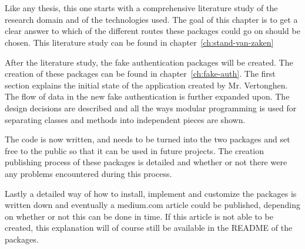 
\chapter{}%
\label{ch:methodologie}

Like any thesis, this one starts with a comprehensive literature study of the research domain and of the technologies used. The goal of this chapter is to get a clear answer to which of the different routes these packages could go on should be chosen. This literature study can be found in chapter~\ref{ch:stand-van-zaken}

After the literature study, the fake authentication packages will be created. The creation of these packages can be found in chapter~\ref{ch:fake-auth}. The first section explains the initial state of the application created by Mr. Vertonghen. The flow of data in the new fake authentication is further expanded upon. The design decisions are described and all the ways modular programming is used for separating classes and methods into independent pieces are shown.

The code is now written, and needs to be turned into the two packages and set free to the public so that it can be used in future projects. The creation publishing process of these packages is detailed and whether or not there were any problems encountered during this process.

Lastly a detailed way of how to install, implement and customize the packages is written down and eventually a medium.com article could be published, depending on whether or not this can be done in time. If this article is not able to be created, this explanation will of course still be available in the README of the packages.
